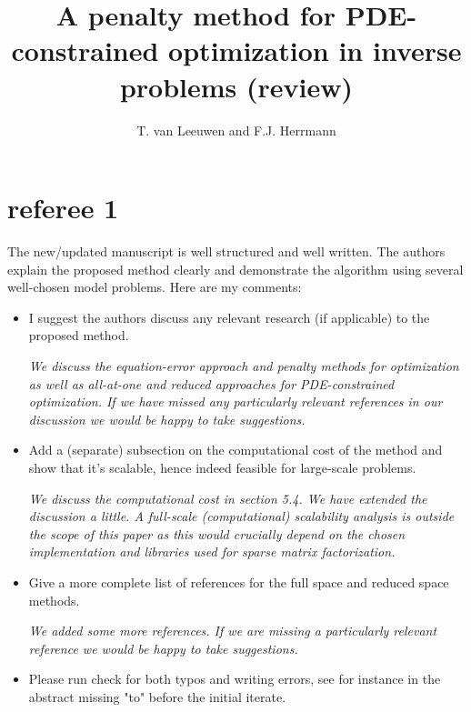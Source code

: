 \documentclass[12pt]{article}
\begin{document}
 
\title{A penalty method for PDE-constrained optimization in inverse problems (review)} 
\author{T. van Leeuwen and F.J. Herrmann} 
\date{} 
\maketitle 
\clearpage
\section{referee 1}
The new/updated manuscript is well structured and well written. The authors explain the proposed method clearly and demonstrate the algorithm using several well-chosen model problems. Here are my comments: 

\begin{itemize}
\item I suggest the authors discuss any relevant research (if applicable) to the proposed method. 

\vspace{5mm}\emph{We discuss the equation-error approach and penalty methods for optimization as well as all-at-one and reduced approaches for PDE-constrained optimization. If we have missed any particularly relevant references in our discussion we would be happy to take suggestions.}



\item Add a (separate) subsection on the computational cost of the method and show that it's scalable, hence indeed feasible for large-scale problems. 

\vspace{5mm}
\emph{We discuss the computational cost in section 5.4. We have extended the discussion a little. A full-scale (computational) scalability analysis is outside the scope of this paper as this would crucially depend on the chosen implementation and libraries used for sparse matrix factorization.}

\item Give a more complete list of references for the full space and reduced space methods. 

\vspace{5mm}
\emph{We added some more references. If we are missing a particularly relevant reference we would be happy to take suggestions.}


\item Please run check for both typos and writing errors, see for instance in the abstract missing "to" before the initial iterate. 
\end{itemize}
\clearpage
\end{document}

